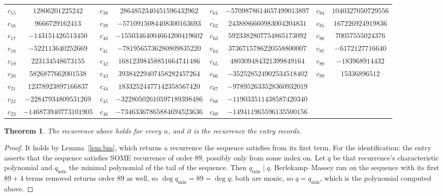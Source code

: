 \documentclass[11pt,a4paper]{article}
\theoremstyle{plain}
\newtheorem{theorem}{Theorem}
\theoremstyle{definition}
\begin{document}
\begin{center}
\begin{tabular}{cccccccc}
$c_{15}$ & $12806201225242$ & $c_{38}$ & $2864852340451596432962$ & $c_{61}$ & $-5709878614657499013897$ & $c_{84}$ & $1040327050729556$ \\
$c_{16}$ & $9666729162413$ & $c_{39}$ & $-5710915084408300163693$ & $c_{62}$ & $2438886660983004204831$ & $c_{85}$ & $167226924919836$ \\
$c_{17}$ & $-143151426513450$ & $c_{40}$ & $-15503464004664200419602$ & $c_{63}$ & $5923382807754865173092$ & $c_{86}$ & $70057555024376$ \\
$c_{18}$ & $-522113640252669$ & $c_{41}$ & $-7819565736280809835220$ & $c_{64}$ & $3736715786220558800007$ & $c_{87}$ & $-6172127716640$ \\
$c_{19}$ & $223134548673155$ & $c_{42}$ & $16812398458851664741486$ & $c_{65}$ & $480309484321399849164$ & $c_{88}$ & $-183968914432$ \\
$c_{20}$ & $5826877662001538$ & $c_{43}$ & $39384229407458282457264$ & $c_{66}$ & $-352528524902534518402$ & $c_{89}$ & $15336896512$ \\
$c_{21}$ & $12378923897166837$ & $c_{44}$ & $18332524477142358567420$ & $c_{67}$ & $-978952633528360932019$ &  &  \\
$c_{22}$ & $-22847934809531269$ & $c_{45}$ & $-32280502610597189398486$ & $c_{68}$ & $-119033511438587420340$ &  &  \\
$c_{23}$ & $-146873940773101905$ & $c_{46}$ & $-73463367865884694523636$ & $c_{69}$ & $-149411965596135500156$ &  &  \\
\end{tabular}
\end{center}

\begin{theorem}
The recurrence above holds for every $n$, and it is the recurrence the entry records.
\end{theorem}

\begin{proof}
It holds by Lemma~\ref{lem:bm}, which returns a recurrence the sequence satisfies from its
first term. For the identification: the entry asserts that the sequence satisfies SOME
recurrence of order $89$, possibly only from some index on. Let $q$ be that recurrence's
characteristic polynomial and $q_{\min}$ the minimal polynomial of the tail of the sequence.
Then $q_{\min}\mid q$. Berlekamp--Massey run on the sequence with its first $89+4$ terms
removed returns order $89$ as well, so $\deg q_{\min}=89=\deg q$; both are monic, so
$q=q_{\min}$, which is the polynomial computed above.
\end{proof}
\end{document}
